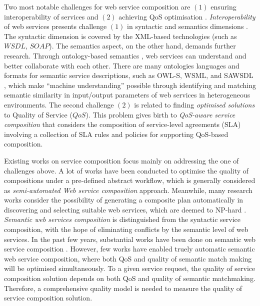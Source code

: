 \documentclass{llncs}
\begin{document}
Two most notable challenges for web service composition are $(1)$ ensuring interoperability of services and $(2)$ achieving QoS optimisation \cite{fensel2011semantic}. \textit{Interoperability} of web services presents challenge $(1)$ in syntactic and semantics dimensions \cite{fensel2011semantic}. The syntactic dimension is covered by the XML-based technologies (such as $WSDL$, $SOAP$). The semantics aspect, on the other hand, demands further research. Through ontology-based semantics \cite{o2005review}, web services can understand and better collaborate with each other. There are many ontologies languages and formats for semantic service descriptions, such as OWL-S, WSML, and SAWSDL \cite{petrie2016web}, which make ``machine understanding'' possible through identifying and matching semantic similarity in input/output parameters of web services in heterogeneous environments. The second challenge $(2)$ is related to finding \textit{optimised solutions} to Quality of Service ($QoS$). This problem gives birth to \textit{QoS-aware service composition} that considers the composition of service-level agreements (SLA) \cite {sahai2002automated} involving a collection of SLA rules and policies for supporting QoS-based composition.

Existing works on service composition focus mainly on addressing the one of challenges above. A lot of works have been conducted to optimise the quality of compositions under a pre-defined abstract workflow, which is generally considered as \textit{semi-automated Web service composition} approach. Meanwhile, many research works consider the possibility of generating a composite plan automatically in discovering and selecting suitable web services, which are deemed to NP-hard \cite{moghaddam2014service}. \textit{Semantic web services composition} is distinguished from the syntactic service composition, with the hope of eliminating conflicts by the semantic level of web services. In the past few years, substantial works have been done on semantic web service composition \cite{fensel2011semantic,lecue2009optimizing}. However, few works have enabled truely automatic semantic web service composition, where both QoS and quality of semantic match making will be optimised simultaneously. To a given service request, the quality of service composition solution depends on both QoS and quality of semantic matchmaking. Therefore, a comprehensive quality model is needed to measure the quality of service composition solution.
\end{document}
